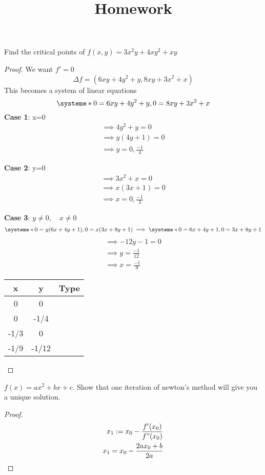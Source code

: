 \documentclass[12pt]{article}
\title{Homework}
\newenvironment{problem}[2][Problem]{\begin{trivlist}
\item[\hskip \labelsep {\bfseries #1}\hskip \labelsep {\bfseries #2.}]}{\end{trivlist}}
\begin{document}
\begin{problem}{6.6}
Find the critical points of $f(x,y) = 3x^2y + 4xy^2 + xy$
\begin{proof}
We want $f'=0$
$$ \Delta f = (6xy + 4y^2 + y, 8xy + 3x^2 + x)$$
This becomes a system of linear equations
\[
\systeme*{0=6xy + 4y^2 + y, 0=8xy + 3x^2 + x}
\]
\textbf{Case 1}: x=0
\begin{align*}
\implies 4y^2 + y = 0 \\
\implies y(4y + 1) = 0 \\
\implies y = 0, \frac{-1}{4}
\end{align*}

\textbf{Case 2}: y=0
\begin{align*}
\implies 3x^2 + x = 0 \\
\implies x(3x + 1) = 0 \\
\implies x = 0, \frac{-1}{3}
\end{align*}

\textbf{Case 3}:
$y \neq 0, \quad x \neq 0$
\[
\systeme*{0=y(6x + 4y + 1), 0=x(3x + 8y + 1)}
\implies \systeme*{0=6x + 4y + 1, 0=3x + 8y + 1}
\]
\begin{align*}
\implies -12y - 1 = 0 \\
\implies y = \frac{-1}{12} \\
\implies x = \frac{-1}{9}
\end{align*}

\begin{center}
 \begin{tabular}{||c c c||}
 \hline
 x & y & Type\\ [0.5ex]
 \hline\hline
 0 & 0 &\\
 \hline
 0 & -1/4\\
 \hline
 -1/3 & 0\\
 \hline
 -1/9 & -1/12\\
 \hline
 \hline
\end{tabular}
\end{center}

\end{proof}
\end{problem}
\begin{problem}{6.11}
$f(x) = ax^2 + bx + c$.
Show that one iteration of newton's method will give you a unique solution.

\begin{proof}
\begin{align*}
x_1:= x_0 - \frac{f'(x_0)}{f"(x_0)} \\
x_1 = x_0 - \frac{2ax_0+b}{2a} \\
\end{align*}
\end{proof}

\end{problem}
\end{document}
